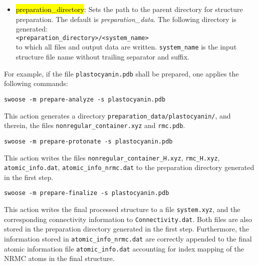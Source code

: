 \documentclass[]{tufte-book}
\begin{document}
{{\begin{itemize}
\item \hl{preparation\_directory}: Sets the path to the parent directory for structure preparation. The default is \textit{preparation\_data}. The following directory is generated:  \\
\texttt{<preparation\_directory>/<system\_name>} \\
to which all files and output data are written. \texttt{system\_name} is the input structure file name without trailing separator and suffix. 
\end{itemize}

For example, if the file \texttt{plastocyanin.pdb} shall be prepared, one applies the following commands:

\begin{mdframed}[backgroundcolor=LightSteelBlue!25, linewidth=0pt]
\begin{verbatim}
swoose -m prepare-analyze -s plastocyanin.pdb 
\end{verbatim}
\end{mdframed}

This action generates a directory \texttt{preparation\_data/plastocyanin/}, and therein, the files \texttt{nonregular\_container.xyz} and  \texttt{rmc.pdb}. 

\begin{mdframed}[backgroundcolor=LightSteelBlue!25, linewidth=0pt]
\begin{verbatim}
swoose -m prepare-protonate -s plastocyanin.pdb 
\end{verbatim}
\end{mdframed}

This action writes the files \texttt{nonregular\_container\_H.xyz}, \texttt{rmc\_H.xyz}, \texttt{atomic\_info.dat}, \texttt{atomic\_info\_nrmc.dat} to the preparation directory generated in the first step. 

\begin{mdframed}[backgroundcolor=LightSteelBlue!25, linewidth=0pt]
\begin{verbatim}
swoose -m prepare-finalize -s plastocyanin.pdb 
\end{verbatim}
\end{mdframed}

This action writes the final processed structure to a file \texttt{system.xyz}, and the corresponding connectivity information to \texttt{Connectivity.dat}. Both files are also stored in the preparation directory generated in the first step. Furthermore, the information stored in \texttt{atomic\_info\_nrmc.dat} are correctly appended to the final atomic information file \texttt{atomic\_info.dat} accounting for index mapping of the NRMC atoms in the final structure. 

}}
\end{document}
